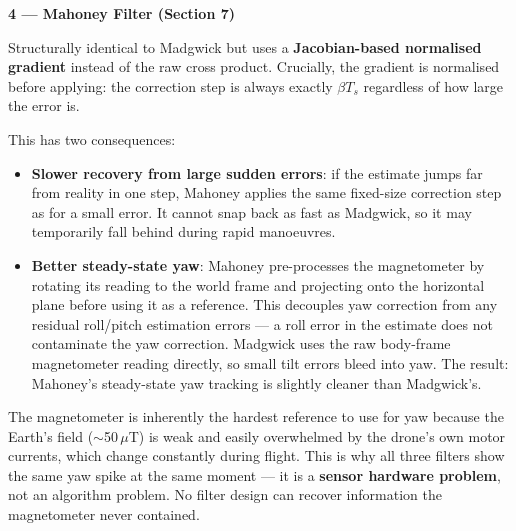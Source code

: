 \documentclass[12pt, a4paper]{article}
\begin{document}
\begin{keybox}
  \textbf{4 --- Mahoney Filter (Section 7)}

  Structurally identical to Madgwick but uses a \textbf{Jacobian-based
  normalised gradient} instead of the raw cross product.
  Crucially, the gradient is normalised before applying: the correction
  step is always exactly $\beta T_s$ regardless of how large the error is.

  This has two consequences:
  \begin{itemize}[leftmargin=1.2em, itemsep=2pt]
    \item \textbf{Slower recovery from large sudden errors}: if the estimate
      jumps far from reality in one step, Mahoney applies the same
      fixed-size correction step as for a small error.
      It cannot snap back as fast as Madgwick, so it may temporarily fall
      behind during rapid manoeuvres.
    \item \textbf{Better steady-state yaw}: Mahoney pre-processes the
      magnetometer by rotating its reading to the world frame and projecting
      onto the horizontal plane before using it as a reference.
      This decouples yaw correction from any residual roll/pitch estimation
      errors --- a roll error in the estimate does not contaminate the yaw
      correction.
      Madgwick uses the raw body-frame magnetometer reading directly, so
      small tilt errors bleed into yaw.
      The result: Mahoney's steady-state yaw tracking is slightly cleaner
      than Madgwick's.
  \end{itemize}

  The magnetometer is inherently the hardest reference to use for yaw
  because the Earth's field ($\sim$50\,$\mu$T) is weak and easily
  overwhelmed by the drone's own motor currents, which change constantly
  during flight.
  This is why all three filters show the same yaw spike at the same moment
  --- it is a \textbf{sensor hardware problem}, not an algorithm problem.
  No filter design can recover information the magnetometer never contained.
\end{keybox}

\vspace{6pt}
\end{document}
